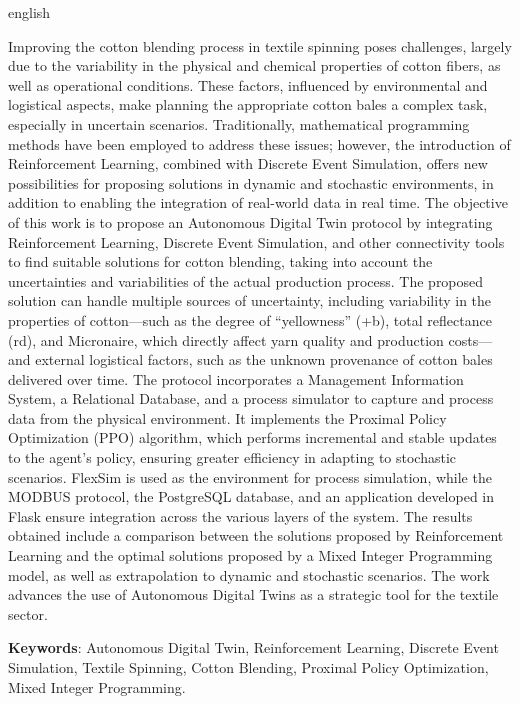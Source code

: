 \documentclass[
    12pt,                %
    openright,           %
    oneside,             %
    a4paper,             %
    english,             %
    spanish,             %
    brazil               %
]{ufscar}
\begin{document}
\begin{resumo}[Abstract]
 \begin{otherlanguage*}{english}

Improving the cotton blending process in textile spinning poses challenges, largely due to the variability in the physical and chemical properties of cotton fibers, as well as operational conditions. These factors, influenced by environmental and logistical aspects, make planning the appropriate cotton bales a complex task, especially in uncertain scenarios. Traditionally, mathematical programming methods have been employed to address these issues; however, the introduction of Reinforcement Learning, combined with Discrete Event Simulation, offers new possibilities for proposing solutions in dynamic and stochastic environments, in addition to enabling the integration of real-world data in real time.
The objective of this work is to propose an Autonomous Digital Twin protocol by integrating Reinforcement Learning, Discrete Event Simulation, and other connectivity tools to find suitable solutions for cotton blending, taking into account the uncertainties and variabilities of the actual production process. The proposed solution can handle multiple sources of uncertainty, including variability in the properties of cotton—such as the degree of “yellowness” (+b), total reflectance (rd), and Micronaire, which directly affect yarn quality and production costs—and external logistical factors, such as the unknown provenance of cotton bales delivered over time.
The protocol incorporates a Management Information System, a Relational Database, and a process simulator to capture and process data from the physical environment. It implements the Proximal Policy Optimization (PPO) algorithm, which performs incremental and stable updates to the agent’s policy, ensuring greater efficiency in adapting to stochastic scenarios. FlexSim is used as the environment for process simulation, while the MODBUS protocol, the PostgreSQL database, and an application developed in Flask ensure integration across the various layers of the system.
The results obtained include a comparison between the solutions proposed by Reinforcement Learning and the optimal solutions proposed by a Mixed Integer Programming model, as well as extrapolation to dynamic and stochastic scenarios. The work advances the use of Autonomous Digital Twins as a strategic tool for the textile sector.

\textbf{Keywords}: Autonomous Digital Twin, Reinforcement Learning, Discrete Event Simulation, Textile Spinning, Cotton Blending, Proximal Policy Optimization, Mixed Integer Programming.


 \end{otherlanguage*}
\end{resumo}
\end{document}
